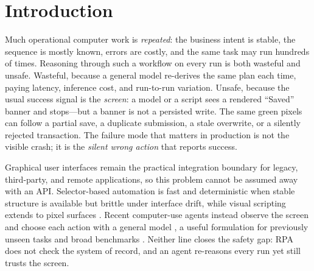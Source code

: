 \section{Introduction}

Much operational computer work is \emph{repeated}: the business intent is stable,
the sequence is mostly known, errors are costly, and the same task may run
hundreds of times. Reasoning through such a workflow on every run is both
wasteful and unsafe. Wasteful, because a general model re-derives the same plan
each time, paying latency, inference cost, and run-to-run variation. Unsafe,
because the usual success signal is the \emph{screen}: a model or a script sees a
rendered ``Saved'' banner and stops---but a banner is not a persisted write. The
same green pixels can follow a partial save, a duplicate submission, a stale
overwrite, or a silently rejected transaction. The failure mode that matters in
production is not the visible crash; it is the \emph{silent wrong action} that
reports success.

Graphical user interfaces remain the practical integration boundary for legacy,
third-party, and remote applications, so this problem cannot be assumed away with
an API. Selector-based automation is fast and deterministic when stable structure
is available but brittle under interface drift, while visual scripting extends to
pixel surfaces \cite{sikuli}. Recent computer-use agents instead observe the
screen and choose each action with a general model
\cite{anthropic2024computeruse,uitars2025,cheng2024seeclick}, a useful
formulation for previously unseen tasks and broad benchmarks
\cite{webarena,workarena,osworld}. Neither line closes the safety gap: RPA does
not check the system of record, and an agent re-reasons every run yet still trusts
the screen.

